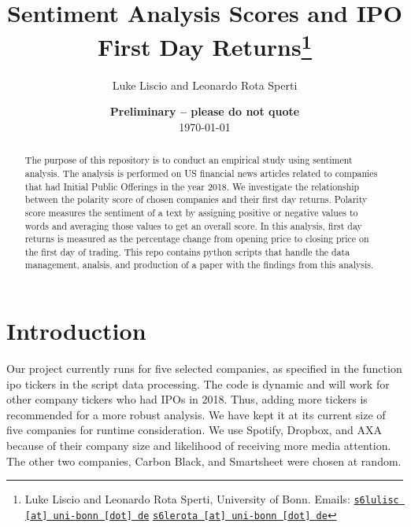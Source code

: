 \documentclass[11pt, a4paper, leqno]{article}
\begin{document}
\title{Sentiment Analysis Scores and IPO First Day Returns\thanks{Luke Liscio and Leonardo Rota Sperti, University of Bonn. Emails: \href{mailto:s6lulisc@uni-bonn.de}{\nolinkurl{s6lulisc [at] uni-bonn [dot] de}} \href{mailto:s6lerota@uni-bonn.de}{\nolinkurl{s6lerota [at] uni-bonn [dot] de}}}}

\author{Luke Liscio and Leonardo Rota Sperti}

\date{
    {\bf Preliminary -- please do not quote}
    \\[1ex]
    \today
}

\maketitle


\begin{abstract}
    The purpose of this repository is to conduct an empirical study using sentiment analysis.
The analysis is performed on US financial news articles related to companies that had Initial Public Offerings in the year 2018.
We investigate the relationship between the polarity score of chosen companies and their first day returns.
Polarity score measures the sentiment of a text by assigning positive or negative values to words and averaging those values to get an overall score.
In this analysis, first day returns is measured as the percentage change from opening price to closing price on the first day of trading.
This repo contains python scripts that handle the data management, analsis, and production of a paper with the findings from this analysis.
\end{abstract}

\clearpage


\section{Introduction} %
\label{sec:introduction}

Our project currently runs for five selected companies, as specified in the function ipo tickers in the script data processing. The code is dynamic and will work for other company tickers who had IPOs in 2018. Thus, adding more tickers is recommended for a more robust analysis. We have kept it at its current size of five companies for runtime consideration.
We use Spotify, Dropbox, and AXA because of their company size and likelihood of receiving more media attention. The other two companies, Carbon Black, and Smartsheet were chosen at random.
\end{document}
